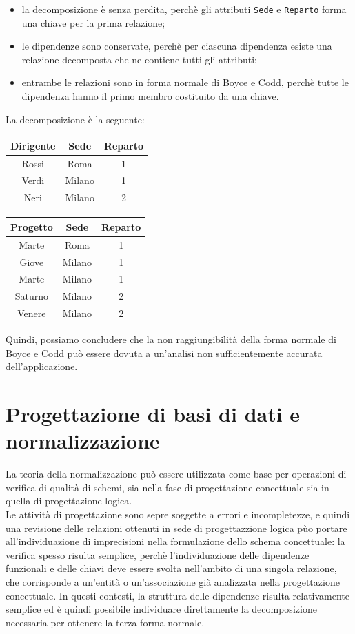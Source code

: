 \documentclass[12pt]{report}
\begin{document}
	\begin{itemize}
		\item la decomposizione è senza perdita, perchè gli attributi \texttt{Sede} e \texttt{Reparto} forma una chiave per la prima relazione;
		\item le dipendenze sono conservate, perchè per ciascuna dipendenza esiste una relazione decomposta che ne contiene tutti gli attributi;
		\item entrambe le relazioni sono in forma normale di Boyce e Codd, perchè tutte le dipendenza hanno il primo membro costituito da una chiave.
	\end{itemize}
	La decomposizione è la seguente:
	\begin{center}
		\begin{tabular}{|c|c|c|}
			\hline
			Dirigente & Sede & Reparto \\
			\hline
			Rossi & Roma & 1 \\
			Verdi & Milano & 1 \\
			Neri & Milano & 2 \\
			\hline
		\end{tabular}
		\hspace{1cm}
		\begin{tabular}{|c|c|c|}
			\hline
			Progetto & Sede & Reparto \\
			\hline
			Marte & Roma & 1 \\
			Giove & Milano & 1 \\
			Marte & Milano & 1 \\
			Saturno & Milano & 2 \\
			Venere & Milano & 2 \\
			\hline
		\end{tabular}
	\end{center}
	Quindi, possiamo concludere che la non raggiungibilità della forma normale di Boyce e Codd può essere dovuta a un'analisi non sufficientemente accurata dell'applicazione.
	\section{Progettazione di basi di dati e normalizzazione}
	La teoria della normalizzazione può essere utilizzata come base per operazioni di verifica di qualità di schemi, sia nella fase di progettazione concettuale sia in quella di progettazione logica. \\
	Le attività di progettazione sono sepre soggette a errori e incompletezze, e quindi una revisione delle relazioni ottenuti in sede di progettazzione logica pùo portare all'individuazione di imprecisioni nella formulazione dello schema concettuale: la verifica spesso risulta semplice, perchè l'individuazione delle dipendenze funzionali e delle chiavi deve essere svolta nell'ambito di una singola relazione, che corrisponde a un'entità o un'associazione già analizzata nella progettazione concettuale. In questi contesti, la struttura delle dipendenze risulta relativamente semplice ed è quindi possibile individuare direttamente la decomposizione necessaria per ottenere la terza forma normale.
\end{document}
